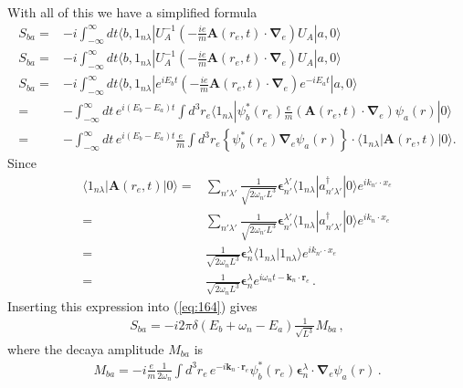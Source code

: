 With all of this we have a simplified formula
\begin{align}
\label{eq:164}
  S_{ba}=&-i\int_{-\infty}^\infty dt\langle b,1_{n\lambda}|U_A^{-1}\left(-\frac{ie}{m}\mathbf{A}(r_e,t)\cdot\boldsymbol{\nabla}_e\right)
  U_A|a,0\rangle\nonumber\\
  S_{ba}=&-i\int_{-\infty}^\infty dt\langle b,1_{n\lambda}|U_A^{-1}\left(-\frac{ie}{m}\mathbf{A}(r_e,t)\cdot\boldsymbol{\nabla}_e\right)
  U_A|a,0\rangle\nonumber\\
  S_{ba}=&-i\int_{-\infty}^\infty dt\langle b,1_{n\lambda}|e^{iE_b t}\left(-\frac{ie}{m}\mathbf{A}(r_e,t)\cdot\boldsymbol{\nabla}_e\right)
  e^{-i E_a t}|a,0\rangle\nonumber\\
  =&-\int_{-\infty}^\infty dt\,e^{i(E_b-E_a)t}\int d^3r_e\langle1_{n\lambda}|\psi_b^*(r_e)\frac{e}{m}\left(\mathbf{A}(r_e,t)\cdot\boldsymbol{\nabla}_e\right)
  \psi_a(r)|0\rangle\nonumber\\
 =&-\int_{-\infty}^\infty dt\,e^{i(E_b-E_a)t}\frac{e}{m}\int d^3r_e\left\{\psi_b^*(r_e)\boldsymbol{\nabla}_e\psi_a(r)\right\}\cdot 
  \langle1_{n\lambda}|\mathbf{A}(r_e,t)|0\rangle.
\end{align}
Since
\begin{align}
  \langle1_{n\lambda}|\mathbf{A}(r_e,t)|0\rangle=&\sum_{n'\lambda'}\frac{1}{\sqrt{2\omega_{n'}L^3}}\boldsymbol{\epsilon}^{\lambda'}_{n'}
  \langle1_{n\lambda}|a^\dagger_{n'\lambda'}|0\rangle e^{i k_{n'}\cdot x_e}\nonumber\\
=&\sum_{n'\lambda'}\frac{1}{\sqrt{2\omega_{n'}L^3}}\boldsymbol{\epsilon}^{\lambda'}_{n'}
  \langle1_{n\lambda}|a^\dagger_{n'\lambda'}|0\rangle e^{i k_{n}\cdot x_e}\nonumber\\
=&\frac{1}{\sqrt{2\omega_{n}L^3}}\boldsymbol{\epsilon}^{\lambda}_{n}
  \langle1_{n\lambda}|1_{n\lambda}\rangle e^{i k_{n'}\cdot x_e}\nonumber\\
=&\frac{1}{\sqrt{2\omega_{n}L^3}}\boldsymbol{\epsilon}^{\lambda}_{n}
  e^{i \omega_n t-\mathbf{k}_n\cdot\mathbf{r}_e}\,.
\end{align}
Inserting this expression into (\ref{eq:164}) gives
\begin{align}
  S_{ba}=-i2\pi \delta(E_b+\omega_n-E_a)\frac{1}{\sqrt{L^3}}M_{ba}\,, 
\end{align}
where the decaya amplitude $M_{ba}$ is
\begin{align}
  M_{ba}=-i\frac{e}{m}\frac{1}{2\omega_n}\int d^3r_e\,e^{-i\mathbf{k}_n\cdot\mathbf{r}_e}
  \psi_b^*(r_e)\boldsymbol{\epsilon}^{\lambda}_{n}\cdot\boldsymbol{\nabla}_e\psi_a(r)\,.
\end{align}
